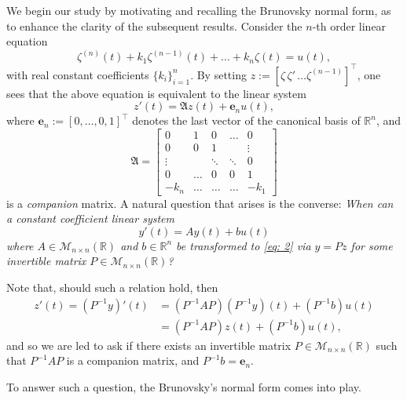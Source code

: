 \documentclass[11pt, a4paper, reqno]{amsart}
\newcommand{\R}{\mathbb{R}}
\theoremstyle{plain}
\numberwithin{equation}{section}
\begin{document}
	We begin our study by motivating and recalling the Brunovsky normal form, as to enhance the clarity of the subsequent results. Consider the $n$-th order linear equation
	\begin{equation}
	\zeta^{(n)}(t) + k_1\zeta^{(n-1)}(t) + \ldots + k_n \zeta(t) = u(t),
	\end{equation}
	with real constant coefficients $\{k_i\}_{i=1}^n$. 
	By setting $z:= \left[\zeta \, \zeta' \, \ldots \zeta^{(n-1)}\right]^\top$, one sees that the above equation is equivalent to the linear system
	\begin{equation} \label{eq: 2}
	z'(t) = \mathfrak{A} z(t) + \mathbf{e}_n u(t),
	\end{equation}
	where $\mathbf{e}_n := [0, \ldots, 0, 1]^\top$ denotes the last vector of the canonical basis of $\R^n$, and
	\begin{equation}
	\mathfrak{A} = \begin{bmatrix} 0& 1& 0& \ldots& 0 \\ 
						     0& 0& 1& & \vdots \\
						     \vdots&  &\ddots& \ddots& 0 \\
						     0& \ldots& 0 & 0 & 1 \\
						     -k_n& \hdots &\hdots &\hdots & -k_1 
				\end{bmatrix}
	\end{equation}
	is a \emph{companion} matrix.
	A natural question that arises is the converse: \emph{When can a constant coefficient linear system 
	\begin{equation}
	y'(t) = Ay(t) + bu(t)
	\end{equation}
	where $A\in \mathcal{M}_{n\times n}(\R)$ and $b\in\R^n$ be transformed to \eqref{eq: 2} via $y=Pz$ for some invertible matrix $P\in\mathcal{M}_{n\times n}(\R)$?} 
	
	Note that, should such a relation hold, then
	\begin{align*}
	z'(t) = \left(P^{-1}y\right)'(t) &= \left(P^{-1}AP\right)\left(P^{-1}y\right)(t) + \left(P^{-1}b\right)u(t)\\
				   &= \left(P^{-1}AP\right)z(t) + \left(P^{-1}b\right)u(t), 
	\end{align*}
	and so we are led to ask if there exists an invertible matrix $P\in\mathcal{M}_{n\times n}(\R)$ such that $P^{-1}AP$ is a companion matrix, and $P^{-1}b=\mathbf{e}_n$.
		
		
	To answer such a question, the Brunovsky's normal form comes into play.
	\medskip
	
\end{document}
